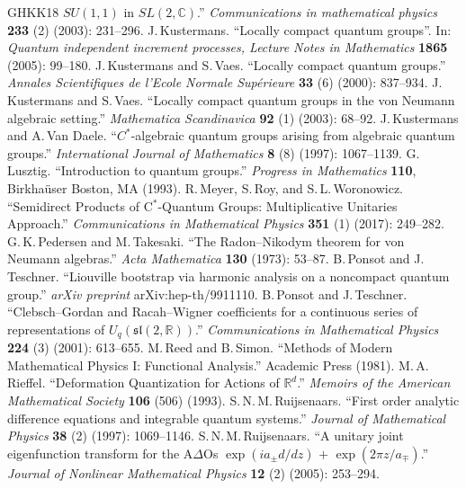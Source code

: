 \documentclass[11pt, reqno]{amsart}
\theoremstyle{definition}
\numberwithin{equation}{section}
\def\C{\mathbb C}
\def\R{\mathbb R}
\def\sl{\mathfrak{sl}}
\begin{document}
\begin{thebibliography}{GHKK18}
$SU(1,1)$ in $SL(2,\C)$.'' \emph{Communications in mathematical physics} \textbf{233} (2) (2003): 231--296.
 J.\,Kustermans. ``Locally compact quantum groups''. In: \emph{Quantum independent increment processes, Lecture Notes in Mathematics} \textbf{1865} (2005): 99--180.
 J.\,Kustermans and S.\,Vaes. ``Locally compact quantum groups.'' \emph{Annales Scientifiques de l’Ecole Normale Sup\'erieure}
\textbf{33} (6) (2000): 837--934.
 J.\,Kustermans and S.\,Vaes. ``Locally compact quantum groups in the von Neumann algebraic setting.'' \emph{Mathematica Scandinavica} \textbf{92} (1) (2003): 68--92.
 J.\,Kustermans and A.\,Van Daele. ``{$C^*$}-algebraic quantum groups arising from algebraic quantum groups.''
\emph{International Journal of Mathematics} \textbf{8} (8) (1997): 1067--1139. 
 G.\,Lusztig. ``Introduction to quantum groups.'' \emph{Progress in Mathematics} \textbf{110}, Birkha\"{u}ser Boston, MA (1993). 
 R.\,Meyer, S.\,Roy, and S.\,L.\,Woronowicz. ``Semidirect Products of C$^*$-Quantum Groups: Multiplicative Unitaries Approach.'' \emph{Communications in Mathematical Physics} \textbf{351} (1) (2017): 249--282.
 G.\,K.\,Pedersen and M.\,Takesaki. ``The Radon--Nikodym theorem for von Neumann algebras.'' \emph{Acta Mathematica} \textbf{130} (1973): 53--87.
 B.\,Ponsot and J.\,Teschner. ``Liouville bootstrap via harmonic analysis on a noncompact quantum group.'' \emph{arXiv preprint} arXiv:hep-th/9911110.
 B.\,Ponsot and J.\,Teschner. ``Clebsch--Gordan and Racah--Wigner coefficients for a continuous series of representations of {$U_q(\sl(2,\mathbb{R}))$}.'' \emph{Communications in Mathematical Physics} \textbf{224} (3) (2001): 613--655. 
 M.\,Reed and B.\,Simon. ``Methods of Modern Mathematical Physics I: Functional Analysis.'' Academic Press (1981).
 M.\,A.\,Rieffel. ``Deformation Quantization for Actions of $\R^d$.'' \emph{
Memoirs of the American Mathematical Society} \textbf{106} (506) (1993).
 S.\,N.\,M.\,Ruijsenaars. ``First order analytic difference equations and integrable quantum systems.''
\emph{Journal of Mathematical Physics} \textbf{38} (2) (1997): 1069--1146.
 S.\,N.\,M.\,Ruijsenaars. ``A unitary joint eigenfunction transform for the A$\Delta$Os $\exp(ia_{\pm}d/dz)$ $+$ $\exp(2\pi z/a_{\mp})$.'' \emph{Journal of Nonlinear Mathematical Physics} \textbf{12} (2) (2005): 253--294.

\end{thebibliography}
\end{document}
